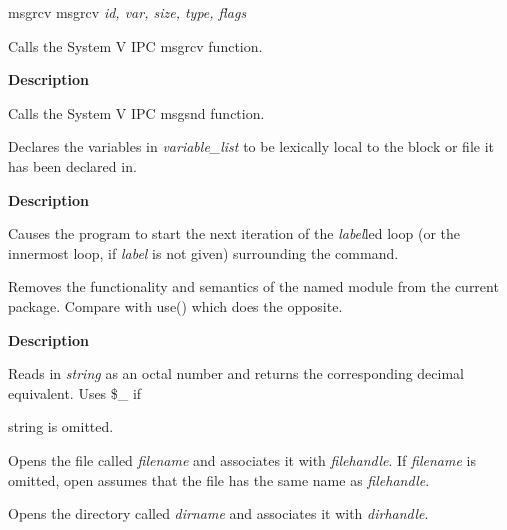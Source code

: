 \documentclass[a4paper,11pt]{book}
\begin{document}
\noindent msgrcv msgrcv \textit{id, var, size, type, flags}

\noindent 

\noindent Calls the System V IPC msgrcv function.

\noindent 

     

\noindent  

\noindent 

\noindent 

\noindent \textbf{Description}

\noindent 

\noindent Calls the System V IPC msgsnd function.

\noindent 

\noindent Declares the variables in \textit{variable\_list }to be lexically local to the block or file it has been declared in.

\noindent 

\noindent 

\noindent 

\noindent 

\noindent \textbf{Description}

\noindent 

\noindent Causes the program to start the next iteration of the \textit{label}led loop (or the innermost loop, if \textit{label }is not given) surrounding the command.

\noindent Removes the functionality and semantics of the named module from the current package. Compare with use() which does the opposite.

\noindent 

\noindent 

\noindent 

\noindent 

\noindent \textbf{Description}

\noindent 

\noindent Reads in \textit{string }as an octal number and returns the corresponding decimal equivalent. Uses \$\_ if

\noindent string is omitted.

\noindent 

\noindent Opens the file called \textit{filename }and associates it with \textit{filehandle}. If \textit{filename }is omitted, open assumes that the file has the same name as \textit{filehandle}.

\noindent 

\noindent Opens the directory called \textit{dirname }and associates it with \textit{dirhandle}.
\end{document}
